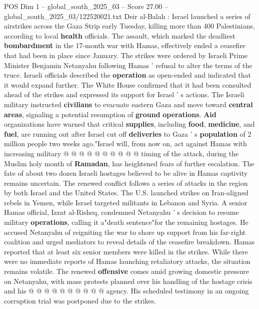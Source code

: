\begin{textsample}{POS Dim 1 – global\_south\_2025\_03 – Score 27.00 – global\_south\_2025\_03/122520021.txt}  \label{ex:f1_pos_266}
Deir al-Balah : Israel launched a series of airstrikes across the Gaza Strip early Tuesday, killing more than 400 Palestinians, according to local \textbf{health} officials.
The assault, which marked the deadliest \textbf{bombardment} in the 17-month war with Hamas, effectively ended a ceasefire that had been in place since January.
The strikes were ordered by Israeli Prime Minister Benjamin Netanyahu following Hamas ' refusal to alter the terms of the truce.
Israeli officials described the \textbf{operation} as open-ended and indicated that it would expand further.
The White House confirmed that it had been consulted ahead of the strikes and expressed its support for Israel ' s actions.
The Israeli military instructed \textbf{civilians} to evacuate eastern Gaza and move toward \textbf{central} \textbf{areas}, signaling a potential resumption of \textbf{ground} \textbf{operations}. \textbf{Aid} organizations have warned that critical \textbf{supplies}, including \textbf{food}, \textbf{medicine}, and \textbf{fuel}, are running out after Israel cut off \textbf{deliveries} to Gaza ' s \textbf{population} of 2 million people two weeks ago."Israel will, from now on, act against Hamas with increasing military @ @ @ @ @ @ @ @ @ @ timing of the attack, during the Muslim holy month of \textbf{Ramadan}, has heightened fears of further escalation.
The fate of about two dozen Israeli hostages believed to be alive in Hamas captivity remains uncertain.
The renewed conflict follows a series of attacks in the region by both Israel and the United States.
The U.S. launched strikes on Iran-aligned rebels in Yemen, while Israel targeted militants in Lebanon and Syria.
A senior Hamas official, Izzat al-Risheq, condemned Netanyahu ' s decision to resume military \textbf{operations}, calling it a"death sentence"for the remaining hostages.
He accused Netanyahu of reigniting the war to shore up support from his far-right coalition and urged mediators to reveal details of the ceasefire breakdown.
Hamas reported that at least six senior members were killed in the strikes.
While there were no immediate reports of Hamas launching retaliatory attacks, the situation remains volatile.
The renewed \textbf{offensive} comes amid growing domestic pressure on Netanyahu, with mass protests planned over his handling of the hostage crisis and his @ @ @ @ @ @ @ @ @ @ agency.
His scheduled testimony in an ongoing corruption trial was postponed due to the strikes.

\end{textsample}
